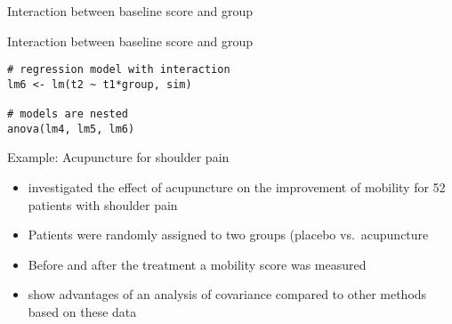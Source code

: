 \documentclass{beamer}
\begin{document}
\begin{frame}{Interaction between baseline score and group}
\begin{center}
\end{center}
\end{frame}

{

\begin{frame}[fragile]{Interaction between baseline score and group}
\begin{lstlisting}
# regression model with interaction
lm6 <- lm(t2 ~ t1*group, sim)

# models are nested
anova(lm4, lm5, lm6)
\end{lstlisting}
\end{frame}

}



\begin{frame}{Example: Acupuncture for shoulder pain}
\begin{itemize}
  \item \citet{Kleinhenz1999} investigated the effect of acupuncture on
    the improvement of mobility for 52 patients with shoulder pain
  \item Patients were randomly assigned to two groups (placebo vs.\
    acupuncture
  \item Before and after the treatment a mobility score was measured
  \item \citet{VickersAltman2001} show advantages of an analysis of
    covariance compared to other methods based on these data
\end{itemize}
\end{frame}
\end{document}
